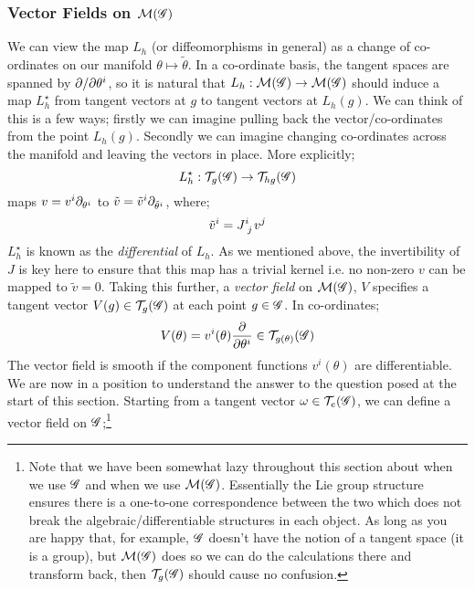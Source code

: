 \subsubsection{Vector Fields on $\mathcal{M}(\mathscr{G})$}
We can view the map $L_h$ (or diffeomorphisms in general) as a change of co-ordinates on our manifold $\theta \mapsto \tilde{\theta}$. In a co-ordinate basis, the tangent spaces are spanned by $\partial/\partial\theta^i$, so it is natural that $L_h : \mathcal{M}(\mathscr{G}) \rightarrow \mathcal{M}(\mathscr{G})$ should induce a map $L_h^{\star}$ from tangent vectors at $g$ to tangent vectors at $L_h(g)$. We can think of this is a few ways; firstly we can imagine pulling back the vector/co-ordinates from the point $L_h(g)$. Secondly we can imagine changing co-ordinates across the manifold and leaving the vectors in place. More explicitly;
\begin{equation*}
L_h^{\star} : \mathcal{T}_g(\mathscr{G}) \rightarrow \mathcal{T}_{hg}(\mathscr{G})
\end{equation*} 
maps $v = v^i \partial_{\theta^i}$ to $\tilde{v} = \tilde{v}^i \partial_{\tilde{\theta}^i}$, where;
\begin{equation*}
\tilde{v}^i = J\indices{^{i}_{j}} v^j
\end{equation*}
$L_h^{\star}$ is known as the \emph{differential} of $L_h$. As we mentioned above, the invertibility of $J$ is key here to ensure that this map has a trivial kernel i.e. no non-zero $v$ can be mapped to $\tilde{v} = 0$. Taking this further, a \emph{vector field} on $\mathcal{M}(\mathscr{G})$, $V$ specifies a tangent vector $V(g) \in \mathcal{T}_g(\mathscr{G})$ at each point $g \in \mathscr{G}$. In co-ordinates;
\begin{equation*}
V(\theta) = v^i(\theta)\frac{\partial}{\partial \theta^i} \in \mathcal{T}_{g(\theta)}(\mathscr{G})
\end{equation*}
The vector field is smooth if the component functions $v^i(\theta)$ are differentiable. We are now in a position to understand the answer to the question posed at the start of this section. Starting from a tangent vector $\omega \in \mathcal{T}_e(\mathscr{G})$, we can define a vector field on $\mathscr{G}$;\footnote{Note that we have been somewhat lazy throughout this section about when we use $\mathscr{G}$ and when we use $\mathcal{M}(\mathscr{G})$. Essentially the Lie group structure ensures there is a one-to-one correspondence between the two which does not break the algebraic/differentiable structures in each object. As long as you are happy that, for example, $\mathscr{G}$ doesn't have the notion of a tangent space (it is a group), but $\mathcal{M}(\mathscr{G})$ does so we can do the calculations there and transform back, then $\mathcal{T}_g(\mathscr{G})$ should cause no confusion.}
